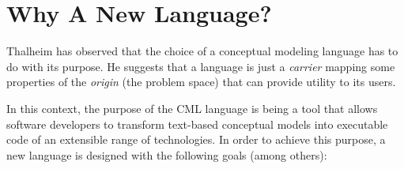 \section{Why A New Language?}\label{sec:why}

Thalheim \cite{thalheim} has observed that
the choice of a conceptual modeling language has to do with its purpose.
He suggests that
a language is just a \emph{carrier} mapping some properties of the \emph{origin} (the problem space)
that can provide utility to its users.

In this context, the purpose of the CML language is being a tool
that allows software developers to transform text-based conceptual models
into executable code of an extensible range of technologies.
In order to achieve this purpose,
a new language is designed with the following goals (among others):

